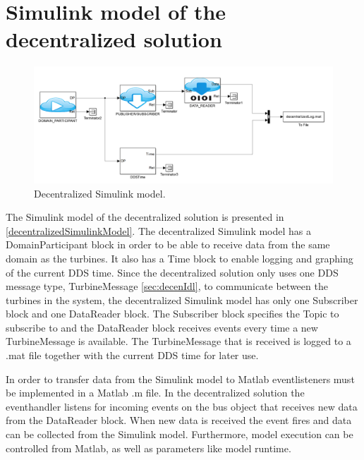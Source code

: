 \section{Simulink model of the decentralized solution}\label{subsec:decentralizedmodel}

\begin{figure}[!h]
\includegraphics[width=\textwidth]{figures/DecentralizedModel}
	\caption[Decentralized Simulink model]{
		\label{fig:decentralizedSimulinkModel} 
		\footnotesize{%
			Decentralized Simulink model.
		}
	}
\end{figure}

The Simulink model of the decentralized solution is presented in \cref{decentralizedSimulinkModel}. The decentralized Simulink model has a DomainParticipant block in order to be able to receive data from the same domain as the turbines. It also has a Time block to enable logging and graphing of the current DDS time. Since the decentralized solution only uses one DDS message type, TurbineMessage \cref{sec:decenIdl}, to communicate between the turbines in the system, the decentralized Simulink model has only one Subscriber block and one DataReader block. The Subscriber block specifies the Topic to subscribe to and the DataReader block receives events every time a new TurbineMessage is available. The TurbineMessage that is received is logged to a .mat file together with the current DDS time for later use.

In order to transfer data from the Simulink model to Matlab eventlisteners must be implemented in a Matlab .m file. In the decentralized solution the eventhandler listens for incoming events on the bus object that receives new data from the DataReader block. When new data is received the event fires and data can be collected from the Simulink model. Furthermore, model execution can be controlled from Matlab, as well as parameters like model runtime. 

